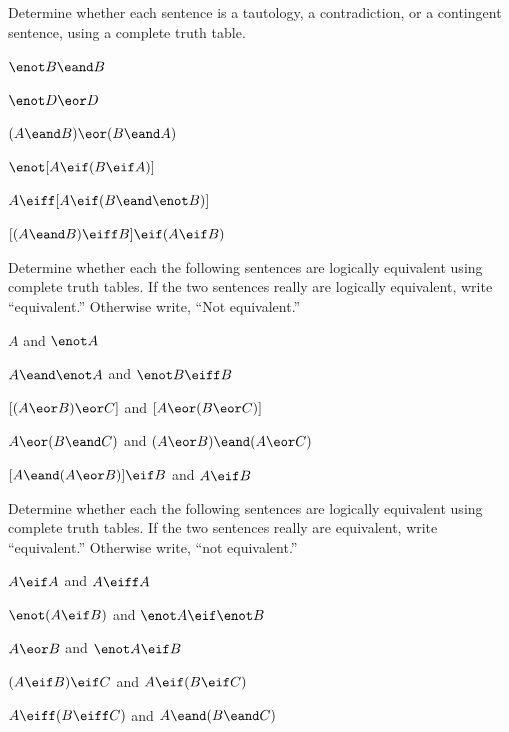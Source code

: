 \problempart Determine whether each sentence is a tautology, a contradiction, or a contingent sentence, using a complete truth table.
\begin{compactlist}
\item $\enot B \eand B$ \vspace{.5ex} \hfill {}


\item $\enot D \eor D$ \vspace{.5ex} \hfill {}


\item $(A\eand B) \eor (B\eand A)$\vspace{.5ex} \hfill {}


\item $\enot[A \eif (B \eif A)]$\vspace{.5ex} \hfill {}


\item $A \eiff [A \eif (B \eand \enot B)]$ \vspace{.5ex} \hfill {}


\item $[(A \eand B) \eiff B] \eif (A \eif B)$ \vspace{.5ex} \hfill {}


\end{compactlist}

\noindent\problempart
\label{pr.TT.equiv}
Determine whether each the following sentences are logically equivalent using complete truth tables. If the two sentences really are logically equivalent, write ``equivalent.'' Otherwise write, ``Not equivalent.'' 
\begin{compactlist}
\item $A$ and $\enot A$
\item $A \eand \enot A$ and $\enot B \eiff B$
\item $[(A \eor B) \eor C]$ and $[A \eor (B \eor C)]$
\item $A \eor (B \eand C)$ and $(A \eor B) \eand (A \eor C)$
\item $[A \eand (A \eor B)] \eif B$ and $A \eif B$\end{compactlist}


\problempart
\label{pr.TT.equiv2}
Determine whether each the following sentences are logically equivalent using complete truth tables. If the two sentences really are equivalent, write ``equivalent.'' Otherwise write, ``not equivalent.''
\begin{compactlist}
\item $A\eif A$ and $A \eiff A$
\item $\enot(A \eif B)$ and $\enot A \eif \enot B$
\item $A \eor B$ and $\enot A \eif B$
\item$(A \eif B) \eif C$ and $A \eif (B \eif C)$
\item $A \eiff (B \eiff C)$ and $A \eand (B \eand C)$
\end{compactlist}

